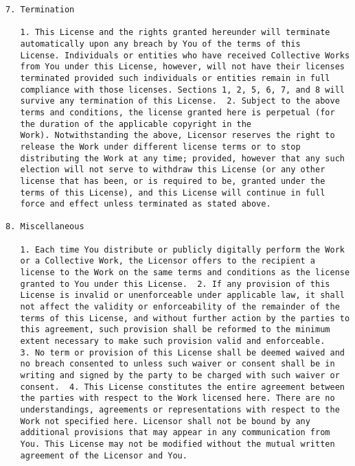 \begin{lstlisting}[firstnumber=1,]
7. Termination

   1. This License and the rights granted hereunder will terminate
   automatically upon any breach by You of the terms of this
   License. Individuals or entities who have received Collective Works
   from You under this License, however, will not have their licenses
   terminated provided such individuals or entities remain in full
   compliance with those licenses. Sections 1, 2, 5, 6, 7, and 8 will
   survive any termination of this License.  2. Subject to the above
   terms and conditions, the license granted here is perpetual (for
   the duration of the applicable copyright in the
   Work). Notwithstanding the above, Licensor reserves the right to
   release the Work under different license terms or to stop
   distributing the Work at any time; provided, however that any such
   election will not serve to withdraw this License (or any other
   license that has been, or is required to be, granted under the
   terms of this License), and this License will continue in full
   force and effect unless terminated as stated above.

8. Miscellaneous

   1. Each time You distribute or publicly digitally perform the Work
   or a Collective Work, the Licensor offers to the recipient a
   license to the Work on the same terms and conditions as the license
   granted to You under this License.  2. If any provision of this
   License is invalid or unenforceable under applicable law, it shall
   not affect the validity or enforceability of the remainder of the
   terms of this License, and without further action by the parties to
   this agreement, such provision shall be reformed to the minimum
   extent necessary to make such provision valid and enforceable.
   3. No term or provision of this License shall be deemed waived and
   no breach consented to unless such waiver or consent shall be in
   writing and signed by the party to be charged with such waiver or
   consent.  4. This License constitutes the entire agreement between
   the parties with respect to the Work licensed here. There are no
   understandings, agreements or representations with respect to the
   Work not specified here. Licensor shall not be bound by any
   additional provisions that may appear in any communication from
   You. This License may not be modified without the mutual written
   agreement of the Licensor and You.

\end{lstlisting}


